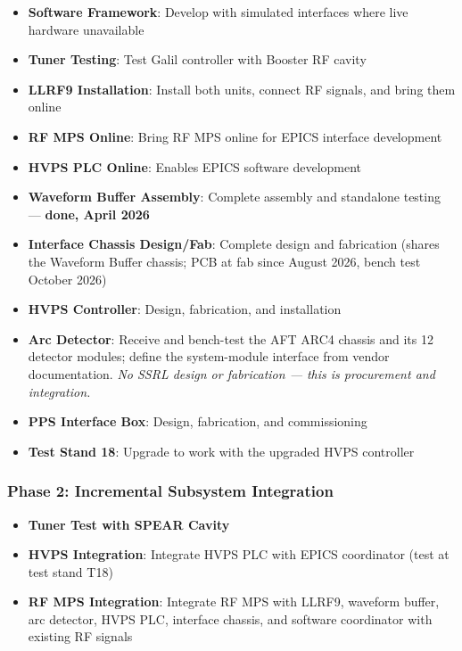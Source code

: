 \begin{itemize}
\tightlist
\item
  \textbf{Software Framework}: Develop with simulated interfaces where live hardware unavailable
\item
  \textbf{Tuner Testing}: Test Galil controller with Booster RF cavity
\item
  \textbf{LLRF9 Installation}: Install both units, connect RF signals, and bring them online
\item
  \textbf{RF MPS Online}: Bring RF MPS online for EPICS interface development
\item
  \textbf{HVPS PLC Online}: Enables EPICS software development
\item
  \textbf{Waveform Buffer Assembly}: Complete assembly and standalone testing --- \textbf{done, April 2026}
\item
  \textbf{Interface Chassis Design/Fab}: Complete design and fabrication (shares the Waveform Buffer chassis; PCB at fab since August 2026, bench test October 2026)
\item
  \textbf{HVPS Controller}: Design, fabrication, and installation
\item
  \textbf{Arc Detector}: Receive and bench-test the AFT ARC4 chassis and its 12 detector modules; define the system-module interface from vendor documentation. \emph{No SSRL design or fabrication --- this is procurement and integration.}
\item
  \textbf{PPS Interface Box}: Design, fabrication, and commissioning
\item
  \textbf{Test Stand 18}: Upgrade to work with the upgraded HVPS controller
\end{itemize}

\subsubsection{Phase 2: Incremental Subsystem Integration}\label{phase-2-incremental-subsystem-integration}

\begin{itemize}
\tightlist
\item
  \textbf{Tuner Test with SPEAR Cavity}
\item
  \textbf{HVPS Integration}: Integrate HVPS PLC with EPICS coordinator (test at test stand T18)
\item
  \textbf{RF MPS Integration}: Integrate RF MPS with LLRF9, waveform buffer, arc detector, HVPS PLC, interface chassis, and software coordinator with existing RF signals
\end{itemize}

